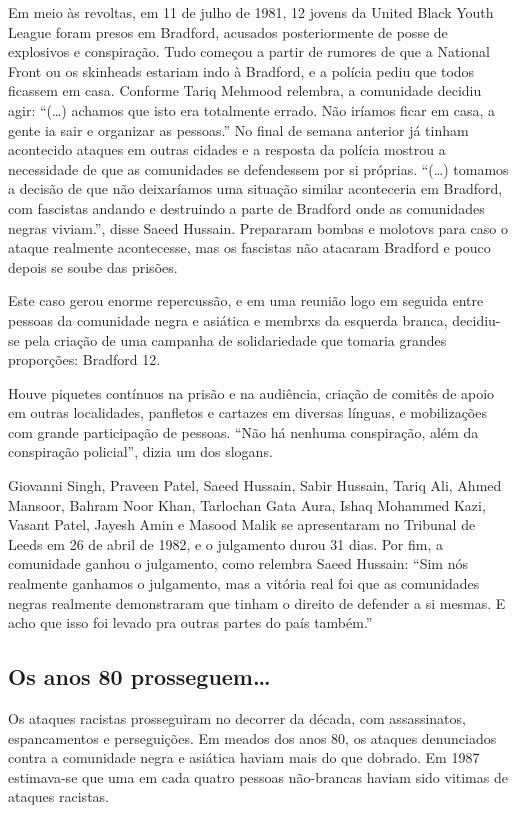 Em meio às revoltas, em 11 de julho de 1981, 12 jovens da United Black Youth League foram presos em Bradford, acusados posteriormente de posse de explosivos e conspiração. Tudo começou a partir de rumores de que a National Front ou os skinheads estariam indo à Bradford, e a polícia pediu que todos ficassem em casa. Conforme Tariq Mehmood relembra, a comunidade decidiu agir: “(…) achamos que isto era totalmente errado. Não iríamos ficar em casa, a gente ia sair e organizar as pessoas.” No final de semana anterior já tinham acontecido ataques em outras cidades e a resposta da polícia mostrou a necessidade de que as comunidades se defendessem por si próprias. “(…) tomamos a decisão de que não deixaríamos uma situação similar aconteceria em Bradford, com fascistas andando e destruindo a parte de Bradford onde as comunidades negras viviam.”, disse Saeed Hussain. Prepararam bombas e molotovs para caso o ataque realmente acontecesse, mas os fascistas não atacaram Bradford e pouco depois se soube das prisões.

Este caso gerou enorme repercussão, e em uma reunião logo em seguida entre pessoas da comunidade negra e asiática e membrxs da esquerda branca, decidiu-se pela criação de uma campanha de solidariedade que tomaria grandes proporções: Bradford 12.

Houve piquetes contínuos na prisão e na audiência, criação de comitês de apoio em outras localidades, panfletos e cartazes em diversas línguas, e mobilizações com grande participação de pessoas. “Não há nenhuma conspiração, além da conspiração policial”, dizia um dos slogans.

Giovanni Singh, Praveen Patel, Saeed Hussain, Sabir Hussain, Tariq Ali, Ahmed Mansoor, Bahram Noor Khan, Tarlochan Gata Aura, Ishaq Mohammed Kazi, Vasant Patel, Jayesh Amin e Masood Malik se apresentaram no Tribunal de Leeds em 26 de abril de 1982, e o julgamento durou 31 dias. Por fim, a comunidade ganhou o julgamento, como relembra Saeed Hussain: “Sim nós realmente ganhamos o julgamento, mas a vitória real foi que as comunidades negras realmente demonstraram que tinham o direito de defender a si mesmas. E acho que isso foi levado pra outras partes do país também.”


\subsection{Os anos 80 prosseguem…}

Os ataques racistas prosseguiram no decorrer da década, com assassinatos, espancamentos e perseguições. Em meados dos anos 80, os ataques denunciados contra a comunidade negra e asiática haviam mais do que dobrado. Em 1987 estimava-se que uma em cada quatro pessoas não-brancas haviam sido vitimas de ataques racistas.

